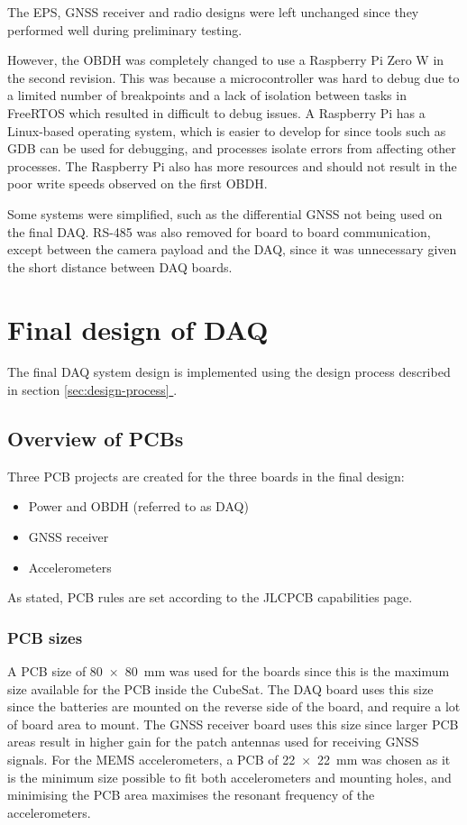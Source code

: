 \documentclass[]{report}
\newcommand*{\secref}[1]{section \hyperref[{#1}]{\ref*{#1} \nameref*{#1}}}
\begin{document}
The EPS, GNSS receiver and radio designs were left unchanged since they performed well during preliminary testing.

However, the OBDH was completely changed to use a Raspberry Pi Zero W in the second revision. This was because a microcontroller was hard to debug due to a limited number of breakpoints and a lack of isolation between tasks in FreeRTOS which resulted in difficult to debug issues. A Raspberry Pi has a Linux-based operating system, which is easier to develop for since tools such as GDB can be used for debugging, and processes isolate errors from affecting other processes. The Raspberry Pi also has more resources and should not result in the poor write speeds observed on the first OBDH.

Some systems were simplified, such as the differential GNSS not being used on the final DAQ. RS-485 was also removed for board to board communication, except between the camera payload and the DAQ, since it was unnecessary given the short distance between DAQ boards.

\chapter{Final design of DAQ}

The final DAQ system design is implemented using the design process described in \secref{sec:design-process}.

\section{Overview of PCBs}

Three PCB projects are created for the three boards in the final design:
\begin{itemize}
  \item Power and OBDH (referred to as DAQ)
  \item GNSS receiver
  \item Accelerometers
\end{itemize}

As stated, PCB rules are set according to the JLCPCB capabilities page.

\subsection{PCB sizes}
A PCB size of \SI{80 x 80}{\milli\metre} was used for the  boards since this is the maximum size available for the PCB inside the CubeSat. The DAQ board uses this size since the batteries are mounted on the reverse side of the board, and require a lot of board area to mount. The GNSS receiver board uses this size since larger PCB areas result in higher gain for the patch antennas used for receiving GNSS signals. For the MEMS accelerometers, a PCB of \SI{22 x 22}{\milli\metre} was chosen as it is the minimum size possible to fit both accelerometers and mounting holes, and minimising the PCB area maximises the resonant frequency of the accelerometers.
\end{document}
